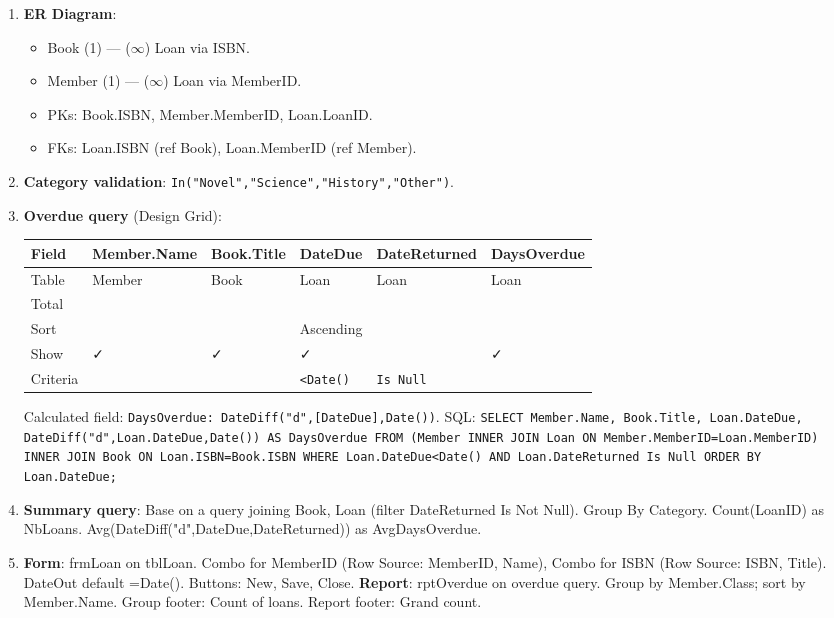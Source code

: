 \documentclass[11pt]{article}
\begin{document}
\begin{corrige}
\begin{enumerate}
\item \textbf{ER Diagram}:
\begin{itemize}
\item Book (1) --- ($\infty$) Loan via ISBN.
\item Member (1) --- ($\infty$) Loan via MemberID.
\item PKs: Book.ISBN, Member.MemberID, Loan.LoanID.
\item FKs: Loan.ISBN (ref Book), Loan.MemberID (ref Member).
\end{itemize}
\item \textbf{Category validation}: \texttt{In("Novel","Science","History","Other")}.
\item \textbf{Overdue query} (Design Grid):
\begin{center}
\begin{tabularx}{\linewidth}{|l|X|X|X|X|X|}
\hline
\rowcolor{popblueL} Field & Member.Name & Book.Title & DateDue & DateReturned & DaysOverdue \\
\hline
Table & Member & Book & Loan & Loan & Loan \\
\hline
Total & & & & & \\
\hline
Sort & & & Ascending & & \\
\hline
Show & ✓ & ✓ & ✓ & & ✓ \\
\hline
Criteria & & & \texttt{<Date()} & \texttt{Is Null} & \\
\hline
\end{tabularx}
\end{center}
Calculated field: \texttt{DaysOverdue: DateDiff("d",[DateDue],Date())}.
SQL: \texttt{SELECT Member.Name, Book.Title, Loan.DateDue, DateDiff("d",Loan.DateDue,Date()) AS DaysOverdue FROM (Member INNER JOIN Loan ON Member.MemberID=Loan.MemberID) INNER JOIN Book ON Loan.ISBN=Book.ISBN WHERE Loan.DateDue<Date() AND Loan.DateReturned Is Null ORDER BY Loan.DateDue;}
\item \textbf{Summary query}: Base on a query joining Book, Loan (filter DateReturned Is Not Null). Group By Category. Count(LoanID) as NbLoans. Avg(DateDiff("d",DateDue,DateReturned)) as AvgDaysOverdue.
\item \textbf{Form}: frmLoan on tblLoan. Combo for MemberID (Row Source: MemberID, Name), Combo for ISBN (Row Source: ISBN, Title). DateOut default =Date(). Buttons: New, Save, Close.
\textbf{Report}: rptOverdue on overdue query. Group by Member.Class; sort by Member.Name. Group footer: Count of loans. Report footer: Grand count.
\end{enumerate}
\end{corrige}
\end{document}
